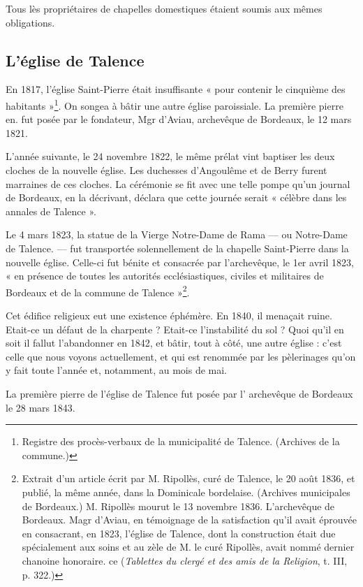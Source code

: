 Tous lès propriétaires de chapelles domestiques étaient soumis aux mêmes obligations.

\subsection{L'église de Talence}

En 1817, l'église Saint-Pierre était insuffisante « pour contenir le cinquième des habitants »\footnote{Registre des procès-verbaux de la municipalité de Talence. (Archives de la commune.)}. On songea à bâtir une autre église paroissiale. La première pierre en. fut posée par le fondateur, Mgr d'Aviau, archevêque de Bordeaux, le 12 mars 1821.

L'année suivante, le 24 novembre 1822, le même prélat vint baptiser les deux cloches de la nouvelle église. Les duchesses d'Angoulême et de Berry furent marraines de ces cloches. La cérémonie se fit avec une telle pompe qu'un journal de Bordeaux, en la décrivant, déclara que cette journée serait « célèbre dans les annales de Talence ». 

Le 4 mars 1823, la statue de la Vierge Notre-Dame de Rama — ou Notre-Dame de Talence. — fut transportée solennellement de la chapelle Saint-Pierre dans la nouvelle église. Celle-ci fut bénite et consacrée par l'archevêque, le 1er avril 1823, « en présence de toutes les autorités ecclésiastiques, civiles et militaires de Bordeaux et de la commune de Talence »\footnote{Extrait d'un article écrit par M. Ripollès, curé de Talence, le 20 août 1836, et publié, la même année, dans la Dominicale bordelaise. (Archives municipales de Bordeaux.) M. Ripollès mourut le 13 novembre 1836. L'archevêque de Bordeaux. Magr d'Aviau, en témoignage de la satisfaction qu'il avait éprouvée en consacrant, en 1823, l'église de Talence, dont la construction était due spécialement aux soins et au zèle de M. le curé Ripollès, avait nommé dernier chanoine honoraire. ce (\textit{Tablettes du clergé et des amis de la Religion}, t. III, p. 322.)}.

Cet édifice religieux eut une existence éphémère. En 1840, il menaçait ruine. Etait-ce un défaut de la charpente ? Etait-ce l'instabilité du sol ? Quoi qu'il en soit il fallut l'abandonner en 1842, et bâtir, tout à côté, une autre église : c'est celle que nous voyons actuellement, et qui est renommée par les pèlerinages qu'on y fait toute l'année et, notamment, au mois de mai.

La première pierre de l'église de Talence fut posée par l' archevêque de Bordeaux le 28 mars 1843.

